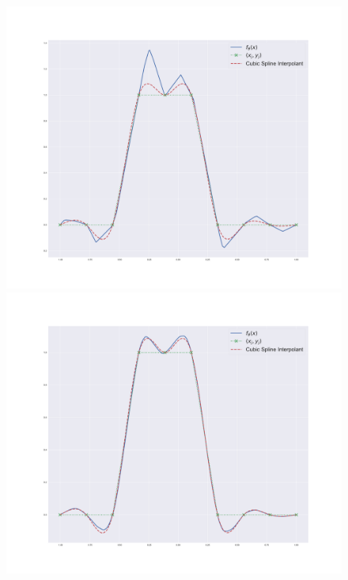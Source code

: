 \begin{figure}\label{fig:cubic_splines}
    \centering
    \includegraphics[width=\linewidth]{figures/cubic_spline100.pdf}
    \endminipage\hfill
    \includegraphics[width=\linewidth]{figures/cubic_spline_1k.pdf}
    \endminipage\hfill

\end{figure}
